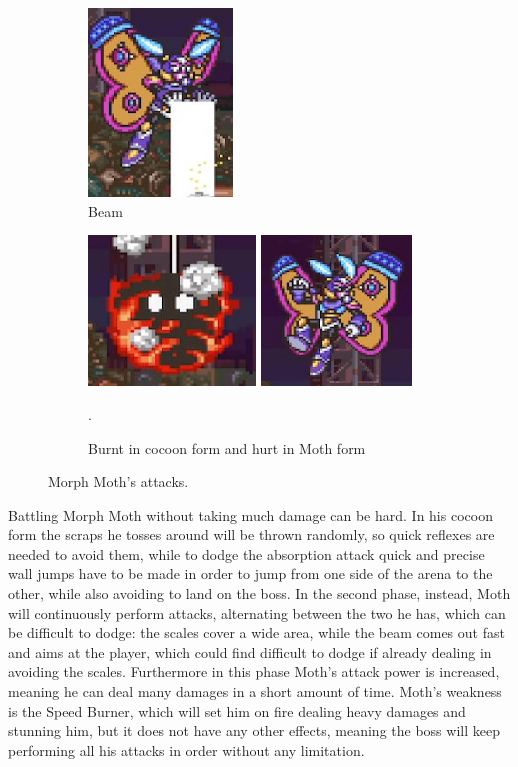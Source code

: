 \begin{figure}
	\ContinuedFloat
	\centering
	\begin{subfigure}{0.4\linewidth}
		\centering
		\includegraphics[height=5cm]{figures/X2/Morph_moth/Moth_beam.jpg}
		\caption{Beam}
	\end{subfigure}
	\begin{subfigure}{\linewidth}
		\centering
		\includegraphics[height=4cm]{figures/X2/Morph_moth/Moth_burn.jpg}
		\includegraphics[height=4cm]{figures/X2/Morph_moth/Moth_hurt.jpg}
		\caption{Burnt in cocoon form and hurt in Moth form}.
	\end{subfigure}
	\caption{Morph Moth's attacks.}
\end{figure}


Battling Morph Moth without taking much damage can be hard. In his cocoon form the scraps he tosses around will be thrown randomly, so quick reflexes are needed to avoid them, while to dodge the absorption attack quick and precise wall jumps have to be made in order to jump from one side of the arena to the other, while also avoiding to land on the boss. In the second phase, instead, Moth will continuously perform attacks, alternating between the two he has, which can be difficult to dodge: the scales cover a wide area, while the beam comes out fast and aims at the player, which could find difficult to dodge if already dealing in avoiding the scales. Furthermore in this phase Moth's attack power is increased, meaning  he can deal many damages in a short amount of time. Moth's weakness is the Speed Burner, which will set him on fire dealing heavy damages and stunning him, but it does not have any other effects, meaning the boss will keep performing all his attacks in order without any limitation.

